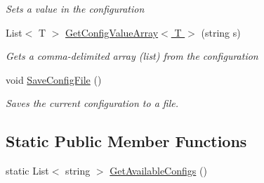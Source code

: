 \begin{DoxyCompactItemize}
\begin{DoxyCompactList}\small\item\em Sets a value in the configuration\end{DoxyCompactList}\item 
List$<$ T $>$ \hyperlink{class_m_b_c_1_1_core_1_1_configuration_a99b689b17905c31fa760cc92ceb2fa89}{Get\-Config\-Value\-Array$<$ T $>$} (string s)
\begin{DoxyCompactList}\small\item\em Gets a comma-\/delimited array (list) from the configuration\end{DoxyCompactList}\item 
void \hyperlink{class_m_b_c_1_1_core_1_1_configuration_a04f21c72d510c6486acfc8c27fdc34ce}{Save\-Config\-File} ()
\begin{DoxyCompactList}\small\item\em Saves the current configuration to a file.\end{DoxyCompactList}\end{DoxyCompactItemize}
\subsection*{Static Public Member Functions}
\begin{DoxyCompactItemize}
\item 
static List$<$ string $>$ \hyperlink{class_m_b_c_1_1_core_1_1_configuration_a6b5833220d539c7b7e48863659bd1cde}{Get\-Available\-Configs} ()
\end{DoxyCompactItemize}
